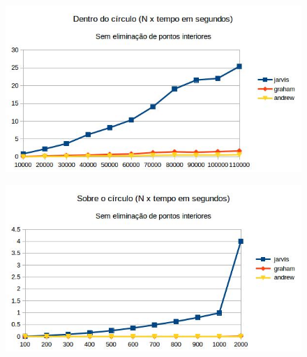 \documentclass[11pt,a4paper]{article}
\begin{document}
        \begin{figure}[!htb]
            \centering
              \begin{minipage}[b]{\textwidth}
              \centering
                  \includegraphics[width=\linewidth]{graph_circulo_no}
                  \label{fig:map}
                \end{minipage}
              \begin{minipage}[b]{\textwidth}
              \centering
                  \includegraphics[width=\linewidth]{graph_sobre_circulo_no}
                  \label{fig:map}
                \end{minipage}
                \caption{}
                \label{fig:sem}
        \end{figure}
\end{document}
